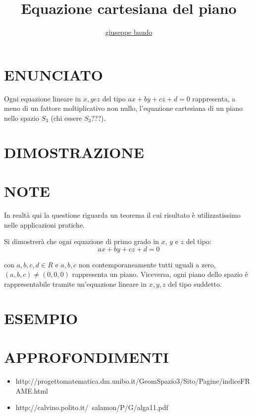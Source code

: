 \documentclass[a4paper,10pt]{article}
\title{Equazione cartesiana del piano}
\author{\href{http://www.baudo.hol.es}{giuseppe baudo}}
\begin{document}
\maketitle

\section{ENUNCIATO}
Ogni equazione lineare in $x,y e z$ del tipo $ax+by+cz+d=0$ rappresenta, a meno di un fattore moltiplicativo non nullo,
l'equazione cartesiana di un piano nello spazio $S_3$ (chi essere $S_3$???).

\section{DIMOSTRAZIONE}

\section{NOTE}
In realtà qui la questione riguarda un teorema il cui risultato è utilizzatissimo nelle applicazioni pratiche.

Si dimostrerà che ogni equazione di primo grado in $x$, $y$ e $z$ del tipo:
\[
 ax+by+cz+d=0
\]

con $a,b,c,d \in R$ e $a,b,c$ non contemporaneamente tutti uguali a zero, $(a,b,c) \ne (0,0,0)$ rappresenta un piano. 
Viceversa, ogni piano dello spazio è rappresentabile tramite un'equazione lineare in $x,y,z$ del tipo suddetto.


\section{ESEMPIO}

\section{APPROFONDIMENTI}
\begin{itemize}
 \item http://progettomatematica.dm.unibo.it/GeomSpazio3/Sito/Pagine/indiceFRAME.html
 \item http://calvino.polito.it/~salamon/P/G/alga11.pdf
\end{itemize}
\end{document}
